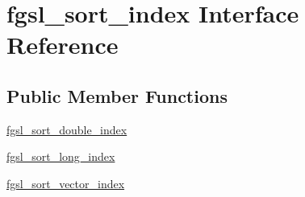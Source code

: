 \hypertarget{interfacefgsl__sort__index}{\section{fgsl\-\_\-sort\-\_\-index Interface Reference}
\label{interfacefgsl__sort__index}
}
\subsection*{Public Member Functions}
\begin{DoxyCompactItemize}
\item 
\hyperlink{interfacefgsl__sort__index_a979dd4912ceb293cd0c6d3b606bee49b}{fgsl\-\_\-sort\-\_\-double\-\_\-index}
\item 
\hyperlink{interfacefgsl__sort__index_a251c58ed6de3572d4667956d6d1b04b3}{fgsl\-\_\-sort\-\_\-long\-\_\-index}
\item 
\hyperlink{interfacefgsl__sort__index_ac0c4d0d023d509a965e1bc935dafbca8}{fgsl\-\_\-sort\-\_\-vector\-\_\-index}
\end{DoxyCompactItemize}


